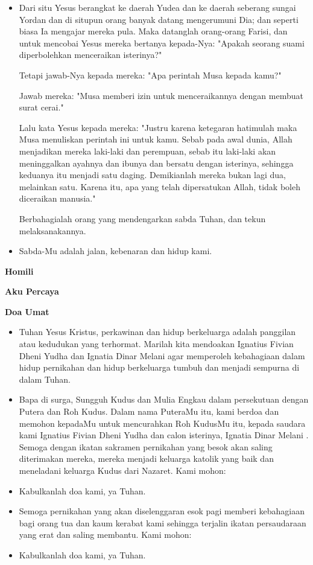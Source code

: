 \documentclass[12pt]{book}
\makeatletter
\newcommand{\subjudul}[1]{%
  {\parindent \z@ \normalfont
    \interlinepenalty\@M \bfseries #1\par\nobreak \vskip 20\p@ }}
\newcommand{\BU}[1]{\begin{itemize} \item[U:] #1 \end{itemize}}
\newcommand{\BI}[1]{\begin{itemize} \item[I:] #1 \end{itemize}}
\newcommand{\BP}[1]{\begin{itemize} \item[P:] #1 \end{itemize}}
\newcommand{\camantri}{Ignatia Dinar Melani }
\newcommand{\camantra}{Ignatius Fivian Dheni Yudha }
\makeatother
\begin{document}
\BI{
Dari situ Yesus berangkat ke daerah Yudea dan ke daerah seberang sungai Yordan dan di situpun orang banyak datang mengerumuni Dia; dan seperti biasa Ia mengajar mereka pula.
Maka datanglah orang-orang Farisi, dan untuk mencobai Yesus mereka bertanya kepada-Nya: "Apakah seorang suami diperbolehkan menceraikan isterinya?"

Tetapi jawab-Nya kepada mereka: "Apa perintah Musa kepada kamu?"

Jawab mereka: "Musa memberi izin untuk menceraikannya dengan membuat surat cerai."

Lalu kata Yesus kepada mereka: "Justru karena ketegaran hatimulah maka Musa menuliskan perintah ini untuk kamu.
Sebab pada awal dunia, Allah menjadikan mereka laki-laki dan perempuan,
sebab itu laki-laki akan meninggalkan ayahnya dan ibunya dan bersatu dengan isterinya,
sehingga keduanya itu menjadi satu daging. Demikianlah mereka bukan lagi dua, melainkan satu.
Karena itu, apa yang telah dipersatukan Allah, tidak boleh diceraikan manusia."

Berbahagialah orang yang mendengarkan sabda Tuhan, dan tekun melaksanakannya.}

\BU{Sabda-Mu adalah jalan, kebenaran dan hidup kami.}

\subjudul{Homili}

\subjudul{Aku Percaya}

\subjudul{Doa Umat}

\BI{Tuhan Yesus Kristus, perkawinan dan hidup berkeluarga adalah panggilan atau kedudukan yang terhormat. Marilah kita mendoakan \camantra dan \camantri agar memperoleh kebahagiaan dalam hidup pernikahan dan hidup berkeluarga tumbuh dan menjadi sempurna di dalam Tuhan.}

\BP{Bapa di surga, Sungguh Kudus dan Mulia Engkau dalam persekutuan dengan Putera dan Roh Kudus. Dalam nama PuteraMu itu, kami berdoa dan memohon kepadaMu untuk mencurahkan Roh KudusMu itu, kepada saudara kami \camantra dan calon isterinya, \camantri. Semoga dengan ikatan sakramen pernikahan yang besok akan saling diterimakan mereka, mereka menjadi keluarga katolik yang baik dan meneladani keluarga Kudus dari Nazaret. Kami mohon:}

\BU{Kabulkanlah doa kami, ya Tuhan.}

\BP{Semoga pernikahan yang akan diselenggaran esok pagi
memberi kebahagiaan bagi orang tua dan kaum kerabat kami sehingga terjalin
ikatan persaudaraan yang erat dan saling membantu. Kami mohon:}

\BU{Kabulkanlah doa kami, ya Tuhan.}
\end{document}
